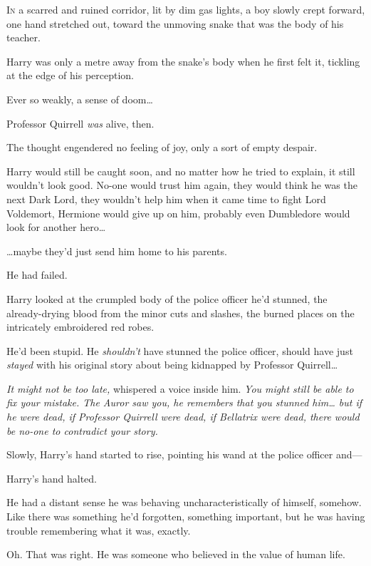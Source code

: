 
\lettrine{I}{n} a scarred and ruined corridor, lit by dim gas lights, a boy slowly crept forward, one hand stretched out, toward the unmoving snake that was the body of his teacher.

Harry was only a metre away from the snake's body when he first felt it, tickling at the edge of his perception.

Ever so weakly, a sense of doom{\ldots}

Professor Quirrell \emph{was} alive, then.

The thought engendered no feeling of joy, only a sort of empty despair.

Harry would still be caught soon, and no matter how he tried to explain, it still wouldn't look good. No-one would trust him again, they would think he was the next Dark Lord, they wouldn't help him when it came time to fight Lord Voldemort, Hermione would give up on him, probably even Dumbledore would look for another hero{\ldots}

{\ldots}maybe they'd just send him home to his parents.

He had failed.

Harry looked at the crumpled body of the police officer he'd stunned, the already-drying blood from the minor cuts and slashes, the burned places on the intricately embroidered red robes.

He'd been stupid. He \emph{shouldn't} have stunned the police officer, should have just \emph{stayed} with his original story about being kidnapped by Professor Quirrell{\ldots}

\emph{It might not be too late,} whispered a voice inside him. \emph{You might still be able to fix your mistake. The Auror saw you, he remembers that you stunned him{\ldots} but if he were dead, if Professor Quirrell were dead, if Bellatrix were dead, there would be no-one to contradict your story.}

Slowly, Harry's hand started to rise, pointing his wand at the police officer and—

Harry's hand halted.

He had a distant sense he was behaving uncharacteristically of himself, somehow. Like there was something he'd forgotten, something important, but he was having trouble remembering what it was, exactly.

Oh. That was right. He was someone who believed in the value of human life.

